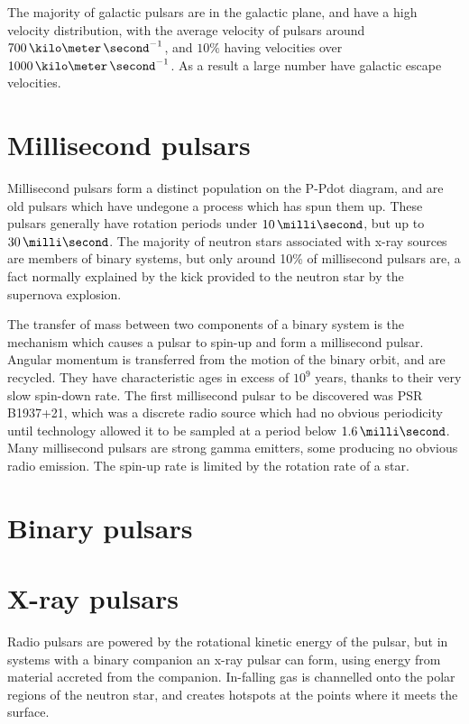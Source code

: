 The majority of galactic pulsars are in the galactic plane, and have a
high velocity distribution, with the average velocity of pulsars
around $700\,\kilo\meter\,\second^{-1}$, and $10\%$ having velocities
over $1000\,\kilo\meter\,\second^{-1}$. As a result a large number
have galactic escape velocities.

\section{Millisecond pulsars}
\label{sec:millisecond-pulsars}

Millisecond pulsars form a distinct population on the P-Pdot diagram,
and are old pulsars which have undegone a process which has spun them
up. These pulsars generally have rotation periods under
$10\,\milli\second$, but up to $30\,\milli\second$. The majority of
neutron stars associated with x-ray sources are members of binary
systems, but only around 10\% of millisecond pulsars are, a fact
normally explained by the kick provided to the neutron star by the
supernova explosion. 

The transfer of mass between two components of a binary system is the
mechanism which causes a pulsar to spin-up and form a millisecond
pulsar. Angular momentum is transferred from the motion of the binary
orbit, and are recycled. They have characteristic ages in excess of
$10^9$ years, thanks to their very slow spin-down rate. The first
millisecond pulsar to be discovered was PSR\,B1937+21, which was a
discrete radio source which had no obvious periodicity until
technology allowed it to be sampled at a period below
$1.6\,\milli\second$. Many millisecond pulsars are strong gamma
emitters, some producing no obvious radio emission. The spin-up rate
is limited by the rotation rate of a star.

\section{Binary pulsars}
\label{sec:binary-pulsars}

\section{X-ray pulsars}
\label{sec:x-ray-pulsars}

Radio pulsars are powered by the rotational kinetic energy of the
pulsar, but in systems with a binary companion an x-ray pulsar can
form, using energy from material accreted from the
companion. In-falling gas is channelled onto the polar regions of the
neutron star, and creates hotspots at the points where it meets the
surface.

